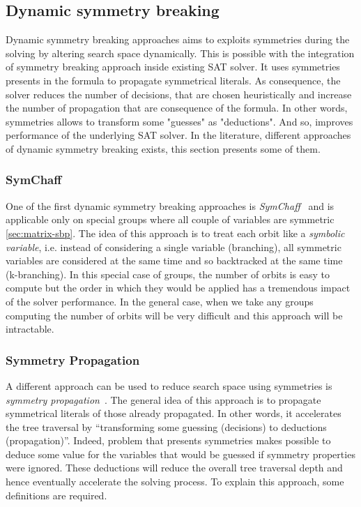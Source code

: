 % 


\subsection{Dynamic symmetry breaking}


Dynamic symmetry breaking approaches aims to exploits symmetries during the solving by altering search space dynamically.
This is possible with the integration of symmetry breaking approach inside existing SAT solver. It uses symmetries presents 
in the formula to propagate symmetrical literals.
As consequence, the solver reduces the number of decisions, that are chosen heuristically and increase the number of propagation
that are consequence of the formula. In other words, symmetries allows to transform some "guesses" as "deductions".
And so, improves performance of the underlying SAT solver.
In the literature, different approaches of dynamic symmetry breaking exists, this section presents some of them.


\subsubsection{SymChaff}
One of the first dynamic symmetry breaking approaches is \emph{SymChaff}~\cite{sabharwal2005symchaff}
and is applicable only on special groups where all couple of variables are symmetric \cref{sec:matrix-sbp}.
The idea of this approach is to treat each orbit like a \emph{symbolic variable}, i.e. instead of considering a single
variable (branching), all symmetric variables are considered at the same time and so backtracked at the same time 
(k-branching).
In this special case of groups, the number of orbits is easy to compute but the order in which they would be
applied has a tremendous impact of the solver performance.
In the general case, when we take any groups computing the number of orbits will be very difficult and this approach
will be intractable.

\subsubsection{Symmetry Propagation}
A different approach can be used to reduce search space using symmetries is \emph{symmetry propagation}~\cite{Devriendt12}.
The general idea of this approach is to propagate symmetrical literals of those already propagated.
In other words, it accelerates the tree traversal by ``transforming some guessing (decisions) to deductions (propagation)''.
Indeed, problem that presents symmetries makes possible to deduce some value 
for the variables that would be guessed if symmetry properties were ignored.
These deductions will reduce the overall tree traversal depth and hence eventually accelerate the solving process.
To explain this approach, some definitions are required.

